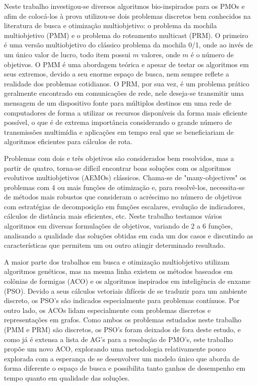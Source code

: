 Neste trabalho investigou-se diversos algoritmos bio-inspirados para os \ac{PMOs} e afim de colocá-los à prova utilizou-se dois problemas discretos bem conhecidos na literatura de busca e otimização multiobjetivo: o problema da mochila multiobjetivo (PMM) e o problema do roteamento multicast (PRM). O primeiro é uma versão multiobjetivo do clássico problema da mochila 0/1, onde ao invés de um único valor de lucro, todo item possui $m$ valores, onde $m$ é o número de objetivos. O PMM é uma abordagem teórica e apesar de testar os algoritmos em seus extremos, devido a seu enorme espaço de busca, nem sempre reflete a realidade dos problemas cotidianos. O PRM, por sua vez, é um problema prático geralmente encontrado em comunicações de rede, nele deseja-se transmitir uma mensagem de um dispositivo fonte para múltiplos destinos em uma rede de computadores de forma a utilizar os recursos disponíveis da forma mais eficiente possível, o que é de extrema importância considerando o grande número de transmissões multimídia e aplicações em tempo real que se beneficiariam de algoritmos eficientes para cálculos de rota.

Problemas com dois e três objetivos são considerados bem resolvidos, mas a partir de quatro, torna-se difícil encontrar boas soluções com os algoritmos evolutivos multiobjetivos (AEMOs) clássicos. Chama-se de "many-objectives" os problemas com 4 ou mais funções de otimização e, para resolvê-los, necessita-se de métodos mais robustos que consideram o acréscimo no número de objetivos com estratégias de decomposição em funções escalares, evolução de indicadores, cálculos de distância mais eficientes, etc. Neste trabalho testamos vários algoritmos em diversas formulações de objetivos, variando de 2 a 6 funções, analisando a qualidade das soluções obtidas em cada um dos casos e discutindo as características que permitem um ou outro atingir determinado resultado.

A maior parte dos trabalhos em busca e otimização multiobjetivo utilizam algoritmos genéticos, mas na mesma linha existem os métodos baseados em colônias de formigas (ACO) e os algoritmos inspirados em inteligência de enxame (PSO). Devido a seus cálculos vetoriais difíceis de se traduzir para um ambiente discreto, os PSO's são indicados especialmente para problemas contínuos. Por outro lado, os ACOs lidam especialmente com problemas discretos e representações em grafos. Como ambos os problemas estudados neste trabalho (PMM e PRM) são discretos, os PSO's foram deixados de fora deste estudo, e como já é extensa a lista de AG's para a resolução de PMO's, este trabalho propõe um novo ACO, explorando uma metodologia relativamente pouco explorada com a esperança de se desenvolver um modelo único que aborda de forma diferente o espaço de busca e possibilita tanto ganhos de desempenho em tempo quanto em qualidade das soluções.

